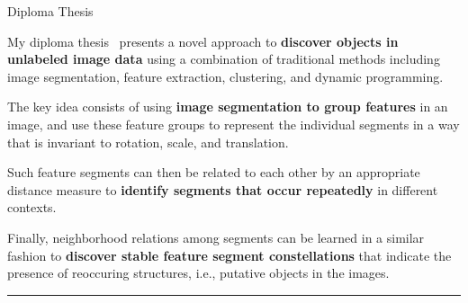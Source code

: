 


\begin{frame}{Diploma Thesis }

\justifying
My diploma thesis~\cite{Kerdels2006} presents a novel approach to {\bf discover 
objects in unlabeled image data} using a combination of traditional methods 
including image segmentation, feature extraction, clustering, and dynamic 
programming.

\vspace{1.5em}
The key idea consists of using {\bf image segmentation to group features} in an 
image, and use these feature groups to represent the individual segments in a 
way that is invariant to rotation, scale, and translation.

\vspace{1.5em}
Such feature segments can then be related to each other by an appropriate 
distance measure to {\bf identify segments that occur repeatedly} in different 
contexts.

\vspace{1.5em}
Finally, neighborhood relations among segments can be learned in a similar 
fashion to {\bf discover stable feature segment constellations} that indicate 
the presence of reoccuring structures, i.e., putative objects in the images.

\begin{center}
\rule{2cm}{0.4pt}\\[0.5em]
\end{center}


\end{frame}



